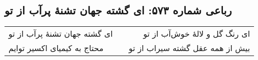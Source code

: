 \begin{center}
\section*{رباعی شماره ۵۷۳: ای گشته جهان تشنهٔ پرآب از تو}
\label{sec:sh573}
\begin{longtable}{l p{0.5cm} r}
ای گشته جهان تشنهٔ پرآب از تو
&&
ای رنگ گل و لالهٔ خوش‌آب از تو
\\
محتاج به کیمیای اکسیر توایم
&&
بیش از همه عقل گشته سیراب از تو
\\
\end{longtable}
\end{center}
